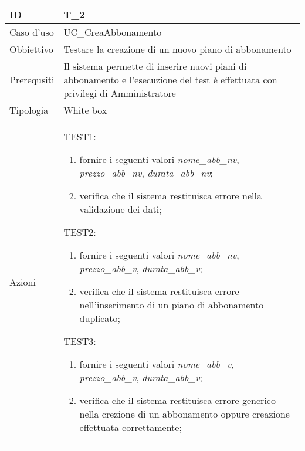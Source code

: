 \begin{table}[hb]
    \centering
    \begin{tabular}{ |p{2cm}|p{10cm}|  }
        \hline
        ID          & T\_2                                                                                                                            \\\hline
        Caso d'uso  & UC\_CreaAbbonamento                                                                                                             \\\hline
        Obbiettivo  & Testare la creazione di un nuovo piano di abbonamento                                                                           \\\hline
        Prerequsiti & Il sistema permette di inserire nuovi piani di abbonamento e l'esecuzione del test è effettuata con privilegi di Amministratore \\\hline
        Tipologia   & White box                                                                                                                       \\\hline
        Azioni      &
        TEST1:
        \begin{enumerate}[nosep, topsep=0pt]
            \item fornire i seguenti valori \emph{nome\_abb\_nv}, \emph{prezzo\_abb\_nv}, \emph{durata\_abb\_nv};
            \item verifica che il sistema restituisca errore nella validazione dei dati;
        \end{enumerate}
        \vspace{0.5cm} TEST2:
        \begin{enumerate}[nosep, topsep=0pt]
            \item fornire i seguenti valori \emph{nome\_abb\_nv}, \emph{prezzo\_abb\_v}, \emph{durata\_abb\_v};
            \item verifica che il sistema restituisca errore nell'inserimento di un piano di abbonamento duplicato;
        \end{enumerate}
        \vspace{0.5cm} TEST3:
        \begin{enumerate}[nosep, topsep=0pt]
            \item fornire i seguenti valori \emph{nome\_abb\_v}, \emph{prezzo\_abb\_v}, \emph{durata\_abb\_v};
            \item verifica che il sistema restituisca errore generico nella crezione di un abbonamento oppure creazione effettuata correttamente;
        \end{enumerate}
        \\\hline
    \end{tabular}
\end{table}

